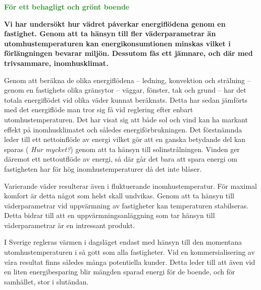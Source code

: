 \documentclass[11pt,a4paper]{article}
\begin{document}
\addtolength{\parindent}{-0.6 cm}
\pagestyle{fancy}
\rhead{\sc\footnotesize \today}
\mbox{}

\begin{center}
\textcolor{ForestGreen}{\textbf{\Huge För ett behagligt och grönt boende}}
\end{center}

\mbox{}

\setlength{\columnsep}{5mm}
\begin{multicols}{2}
\addtolength{\parskip}{1.2ex}
\linespread{1.02}
\normalsize



\textbf{Vi har undersökt hur vädret påverkar energiflödena genom en fastighet. Genom att ta hänsyn till fler väderparametrar än utomhustemperaturen kan energikonsumtionen minskas vilket i förlängningen bevarar miljön. Dessutom fås ett jämnare, och där med trivsammare, inomhusklimat.}

Genom att beräkna de olika energiflödena – ledning, konvektion och strålning – genom en fastighets olika gränsytor – väggar, fönster, tak och grund – har det totala energiflödet vid olika väder kunnat beräknats. Detta har sedan jämförts med det energiflöde man tror sig få vid reglering efter enbart utomhustemperaturen. 
Det har visat sig att både sol och vind kan
ha markant effekt på inomhusklimatet och således energiförbrukningen. Det 
förstnämnda leder till ett nettoinflöde av energi vilket gör att en ganska
betydande del kan sparas (\emph{\color{red} Hur mycket?}) genom att ta hänsyn till solinstrålningen. Vinden
ger däremot ett nettoutflöde av energi, så där går det bara att spara energi
om fastigheten har för hög inomhus\-temperaturer då det inte blåser.

Varierande väder resulterar även i fluktuerande inomhustemperatur. För maximal komfort är detta något som helst skall undvikas. Genom att ta hänsyn till väderparametrar vid uppvärmning av fastigheter kan temperaturen stabilseras. Detta bidrar till att en uppvärmningsanläggning som tar hänsyn till väderparametrar är en intressant produkt.

I Sverige regleras värmen i dagsläget endast med hänsyn till den momentana utomhustemperaturen i så gott som alla fastigheter. Vid en kommersialisering av våra
resultat finns således många potentiella kunder. Detta leder till att även vid en liten
energibesparing blir mängden sparad energi för de boende, och för samhället,
stor i slutändan.


\end{multicols}
\end{document}
